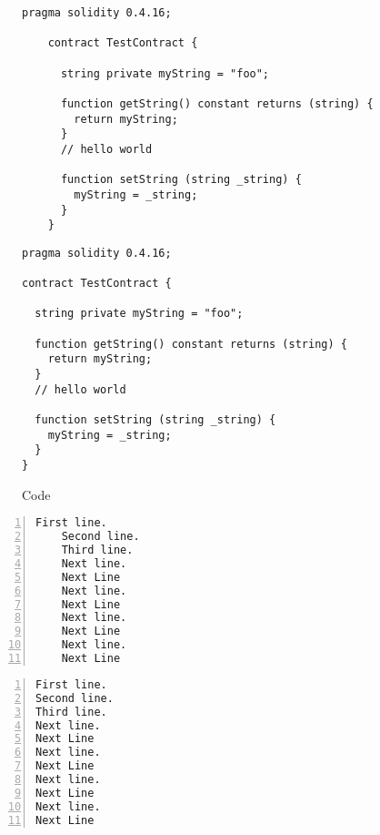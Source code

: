 \documentclass[twocolumn]{article}
\begin{document}
\begin{figure*}[hbtp]
	\caption{Code}
	\label{code.1}
\lipsum[1]
\begin{multicols}{2}
\begin{lstlisting}[language=Solidity] 
	pragma solidity 0.4.16;		
	
	contract TestContract {	
	  
	  string private myString = "foo";	
	  
	  function getString() constant returns (string) {
		return myString;
	  }
	  // hello world
			
	  function setString (string _string) {
		myString = _string;
	  }
	}
\end{lstlisting}
\end{multicols}
\lipsum[2]
\clearpage
\twocolumn
\lipsum[1]
\lipsum[2]
\begin{lstlisting}[language=Solidity] 
pragma solidity 0.4.16;

contract TestContract {

  string private myString = "foo";

  function getString() constant returns (string) {
    return myString;
  }
  // hello world

  function setString (string _string) {
    myString = _string;
  }
}
\end{lstlisting}
\lipsum[2]
\end{figure*}

\lipsum[1]
\begin{multicols}{2}
	\begin{lstlisting}[numbers=left,xleftmargin=3em]
	First line.
	Second line.
	Third line.
	Next line.
	Next Line
	Next line.
	Next Line
	Next line.
	Next Line
	Next line.
	Next Line
	\end{lstlisting}
\end{multicols}
\lipsum[2]
\clearpage
\twocolumn
\lipsum[1]
\lipsum[2]
\begin{lstlisting}[numbers=left,xleftmargin=3em]
First line.
Second line.
Third line.
Next line.
Next Line
Next line.
Next Line
Next line.
Next Line
Next line.
Next Line
\end{lstlisting}
\lipsum[2]
\end{document}
